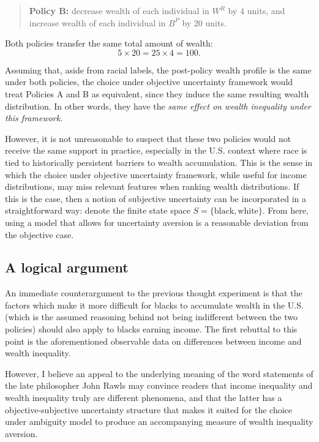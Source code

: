 \documentclass[Chp3.tex]{subfiles}
\begin{document}
\begin{quote}
\textbf{Policy B:} decrease wealth of each individual in $W^R$ by $4$ units, and increase wealth of each individual in $B^P$ by $20$ units.
\end{quote}

\par Both policies transfer the same total amount of wealth:
\[
5\times 20 = 25\times 4 = 100.
\]

\par Assuming that, aside from racial labels, the post-policy wealth profile is the same under both policies, the choice under objective uncertainty framework would treat Policies A and B as equivalent, since they induce the same resulting wealth distribution. In other words, they have the \textit{same effect on wealth inequality under this framework}.

\par However, it is not unreasonable to suspect that these two policies would not receive the same support in practice, especially in the U.S. context where race is tied to historically persistent barriers to wealth accumulation. This is the sense in which the choice under objective uncertainty framework, while useful for income distributions, may miss relevant features when ranking wealth distributions. If this is the case, then a notion of subjective uncertainty can be incorporated in a straightforward way: denote the finite state space $S=\{\text{black},\text{white}\}$. From here, using a model that allows for uncertainty aversion is a reasonable deviation from the objective case.


\subsection{A logical argument}

\par An immediate counterargument to the previous thought experiment is that the factors which make it more difficult for blacks to accumulate wealth in the U.S. (which is the assumed reasoning behind not being indifferent between the two policies) should also apply to blacks earning income. The first rebuttal to this point is the aforementioned observable data on differences between income and wealth inequality.  

\par However, I believe an appeal to the underlying meaning of the word  statements of the late philosopher John Rawls may convince readers that income inequality and wealth inequality truly are different phenomena, and that the latter has a objective-subjective uncertainty structure that makes it suited for the choice under ambiguity model to produce an accompanying measure of wealth inequality aversion. 
\end{document}

